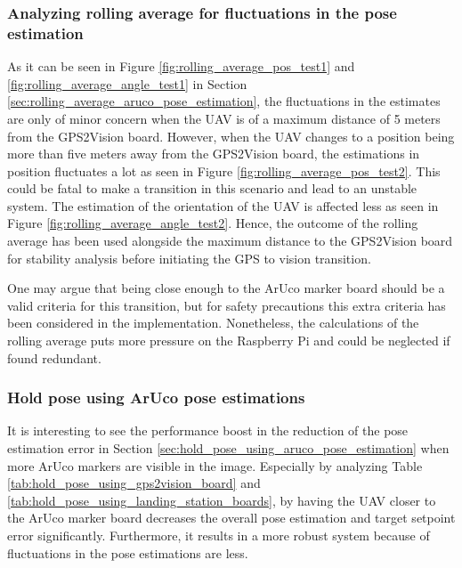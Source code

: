 \documentclass[../Head/report.tex]{subfiles}
\begin{document}
\subsubsection*{Analyzing rolling average for fluctuations in the pose estimation}
As it can be seen in Figure \ref{fig:rolling_average_pos_test1} and \ref{fig:rolling_average_angle_test1} in Section \ref{sec:rolling_average_aruco_pose_estimation}, the fluctuations in the estimates are only of minor concern when the UAV is of a maximum distance of 5 meters from the GPS2Vision board. However, when the UAV changes to a position being more than five meters away from the GPS2Vision board, the estimations in position fluctuates a lot as seen in Figure \ref{fig:rolling_average_pos_test2}. This could be fatal to make a transition in this scenario and lead to an unstable system. The estimation of the orientation of the UAV is affected less as seen in Figure \ref{fig:rolling_average_angle_test2}. Hence, the outcome of the rolling average has been used alongside the maximum distance to the GPS2Vision board for stability analysis before initiating the GPS to vision transition. 

One may argue that being close enough to the ArUco marker board should be a valid criteria for this transition, but for safety precautions this extra criteria has been considered in the implementation. Nonetheless, the calculations of the rolling average puts more pressure on the Raspberry Pi and could be neglected if found redundant.     

\subsubsection*{Hold pose using ArUco pose estimations}
It is interesting to see the performance boost in the reduction of the pose estimation error in Section \ref{sec:hold_pose_using_aruco_pose_estimation} when more ArUco markers are visible in the image. Especially by analyzing Table \ref{tab:hold_pose_using_gps2vision_board} and \ref{tab:hold_pose_using_landing_station_boards}, by having the UAV closer to the ArUco marker board decreases the overall pose estimation and target setpoint error significantly. Furthermore, it results in a more robust system because of fluctuations in the pose estimations are less. 
\end{document}
